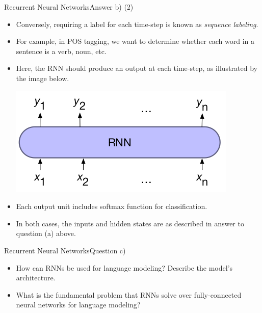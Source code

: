 \documentclass[t]{beamer}
\begin{document}
\begin{frame}{Recurrent Neural Networks}{Answer b) (2)}
    \begin{itemize}
        \item Conversely, requiring a label for each time-step is known as
              \emph{sequence labeling}.
        \item For example, in POS tagging, we want to determine whether each
              word in a sentence is a verb, noun, etc.
        \item Here, the RNN should produce an output at each time-step, as
              illustrated by the image below.
              \begin{center}
                  \includegraphics[scale=0.5]{img/sequence_labeling_1.png}
              \end{center}
        \item Each output unit includes softmax function for classification.
        \item In both cases, the inputs and hidden states are as described in
              answer to question (a) above.
    \end{itemize}
\end{frame}

\begin{frame}{Recurrent Neural Networks}{Question c)}
    \begin{itemize}
        \item How can RNNs be used for language modeling? Describe the model's
              architecture.
        \item What is the fundamental problem that RNNs solve over
              fully-connected neural networks for language modeling?
    \end{itemize}
\end{frame}
\end{document}
